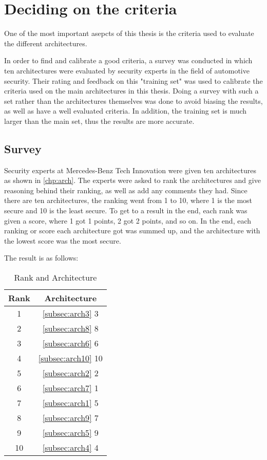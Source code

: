 \chapter{Deciding on the criteria}
\label{chp:criteria}

One of the most important asepcts of this thesis is the criteria used to evaluate the different architectures.

In order to find and calibrate a good criteria, a survey was conducted in which ten architectures were evaluated by security experts in the field of automotive security.
Their rating and feedback on this "training set" was used to calibrate the criteria used on the main architectures in this thesis.
Doing a survey with such a set rather than the architectures themselves was done to avoid biasing the results, as well as have a well evaluated criteria.
In addition, the training set is much larger than the main set, thus the results are more accurate.

\section{Survey}
\label{sec:survey}

Security experts at Mercedes-Benz Tech Innovation were given ten architectures as shown in \ref{chp:arch}.
The experts were asked to rank the architectures and give reasoning behind their ranking, as well as add any comments they had.
Since there are ten architectures, the ranking went from 1 to 10, where 1 is the most secure and 10 is the least secure.
To get to a result in the end, each rank was given a score, where 1 got 1 points, 2 got 2 points, and so on.
In the end, each ranking or score each architecture got was summed up, and the architecture with the lowest score was the most secure.

The result is as follows:

\begin{table}[h]
    \centering
    \caption{Rank and Architecture}
    \begin{tabular}{ |c|c| } 
    \hline
    Rank & Architecture \\
    \hline
    1 & \ref{subsec:arch3} 3\\
    2 & \ref{subsec:arch8} 8\\
    3 & \ref{subsec:arch6} 6\\
    4 & \ref{subsec:arch10} 10\\
    5 & \ref{subsec:arch2} 2\\
    6 & \ref{subsec:arch7} 1\\
    7 & \ref{subsec:arch1} 5\\
    8 & \ref{subsec:arch9} 7\\
    9 & \ref{subsec:arch5} 9\\
    10 & \ref{subsec:arch4} 4\\
    \hline
    \end{tabular}
\end{table}

